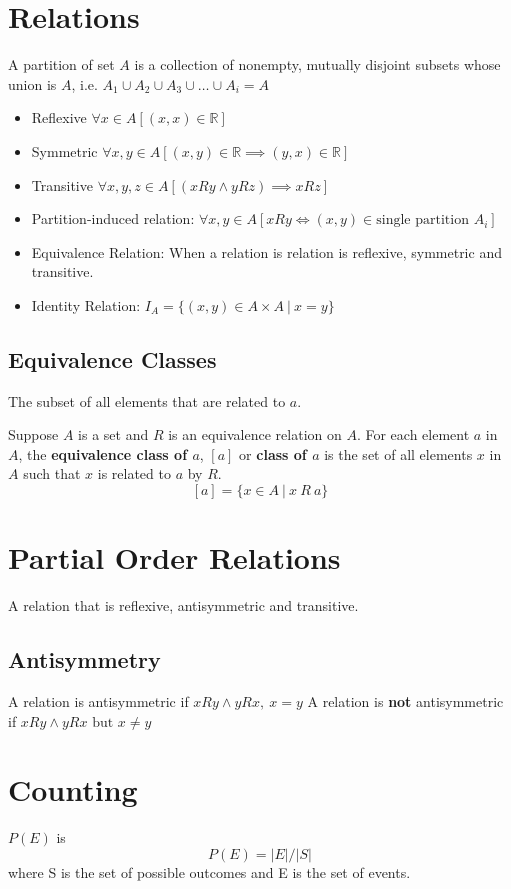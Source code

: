 \documentclass[landscape, letterpaper, 8pt]{extarticle}
\begin{document}
\begin{multicols}{3}
    \section*{Relations}
    A partition of set $A$ is a collection of nonempty, mutually disjoint subsets whose union is $A$, i.e. $A_1 \cup A_2 \cup A_3 \cup \ldots \cup A_i = A$
    \begin{itemize}[noitemsep,nolistsep]
        \item Reflexive $\forall x \in A[(x, x) \in \mathbb{R}]$
        \item Symmetric $\forall x, y \in A[(x, y) \in \mathbb{R} \implies (y, x) \in \mathbb{R}]$
        \item Transitive $\forall x, y, z \in A[(x R y \land y R z)\implies x R z]$
        \item Partition-induced relation: $\forall x, y \in A[x R y \iff (x, y) \in \text{single partition }A_i]$
        \item Equivalence Relation: When a relation is relation is reflexive, symmetric and transitive.
        \item Identity Relation: $I_A = \{(x, y) \in A \times A~|~x=y\}$
    \end{itemize}
    \subsection*{Equivalence Classes}
    The subset of all elements that are related to $a$.

    Suppose $A$ is a set and $R$ is an equivalence relation on $A$. For each element $a$ in $A$, the \textbf{equivalence class of $a$}, $[a]$ or \textbf{class of $a$} is the set of all elements $x$ in $A$ such that $x$ is related to $a$ by $R$. \[[a] = \{x \in A~|~x~R~a\}\]
    \section*{Partial Order Relations}
    A relation that is reflexive, antisymmetric and transitive.
    \subsection*{Antisymmetry}
    A relation is antisymmetric if $x R y \land y R x,~x = y$
    A relation is \textbf{not} antisymmetric if $x R y \land y R x\text{ but }x \neq y$
    \section*{Counting}
    $P(E)$ is \[P(E) = |E|/|S|\] where S is the set of possible outcomes and E is the set of events.


\end{multicols}
\end{document}
